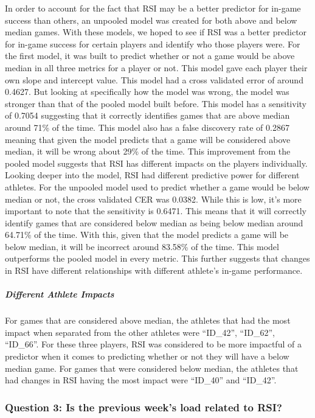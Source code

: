 \documentclass[
]{article}
\begin{document}
In order to account for the fact that RSI may be a better predictor for
in-game success than others, an unpooled model was created for both
above and below median games. With these models, we hoped to see if RSI
was a better predictor for in-game success for certain players and
identify who those players were. For the first model, it was built to
predict whether or not a game would be above median in all three metrics
for a player or not. This model gave each player their own slope and
intercept value. This model had a cross validated error of around
0.4627. But looking at specifically how the model was wrong, the model
was stronger than that of the pooled model built before. This model has
a sensitivity of 0.7054 suggesting that it correctly identifies games
that are above median around 71\% of the time. This model also has a
false discovery rate of 0.2867 meaning that given the model predicts
that a game will be considered above median, it will be wrong about 29\%
of the time. This improvement from the pooled model suggests that RSI
has different impacts on the players individually. Looking deeper into
the model, RSI had different predictive power for different athletes.
For the unpooled model used to predict whether a game would be below
median or not, the cross validated CER was 0.0382. While this is low,
it's more important to note that the sensitivity is 0.6471. This means
that it will correctly identify games that are considered below median
as being below median around 64.71\% of the time. With this, given that
the model predicts a game will be below median, it will be incorrect
around 83.58\% of the time. This model outperforms the pooled model in
every metric. This further suggests that changes in RSI have different
relationships with different athlete's in-game performance.

\subparagraph{Different Athlete
Impacts}\label{different-athlete-impacts}

For games that are considered above median, the athletes that had the
most impact when separated from the other athletes were ``ID\_42'',
``ID\_62'', ``ID\_66''. For these three players, RSI was considered to
be more impactful of a predictor when it comes to predicting whether or
not they will have a below median game. For games that were considered
below median, the athletes that had changes in RSI having the most
impact were ``ID\_40'' and ``ID\_42''.

\subsubsection{Question 3: Is the previous week's load related to
RSI?}\label{question-3-is-the-previous-weeks-load-related-to-rsi}
\end{document}
